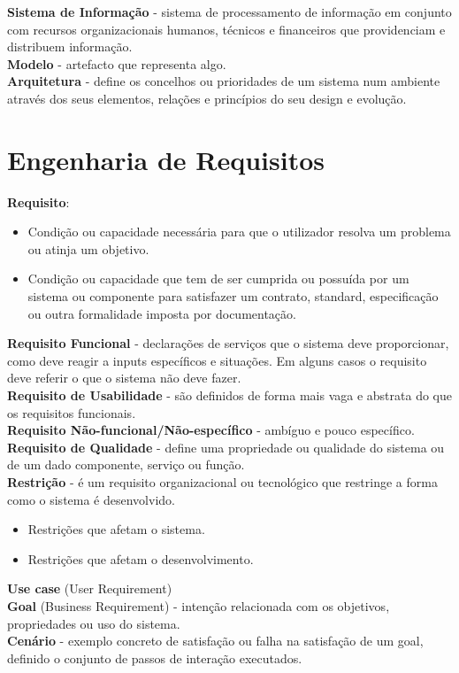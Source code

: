 \documentclass[12pt]{article}
\begin{document}
\vspace{6pt}
\textbf{Sistema de Informação} - sistema de processamento de informação em conjunto com recursos organizacionais humanos, técnicos e financeiros que providenciam e distribuem informação.
\\[6pt]
\textbf{Modelo} - artefacto que representa algo.
\\[6pt]
\textbf{Arquitetura} - define os concelhos ou prioridades de um sistema num ambiente através dos seus elementos, relações e princípios do seu design e evolução.

\newpage

\section{Engenharia de Requisitos}

\textbf{Requisito}:
\begin{itemize}[topsep=0pt, itemsep=0pt]
    \item Condição ou capacidade necessária para que o utilizador resolva um problema ou atinja um objetivo.
    \item Condição ou capacidade que tem de ser cumprida ou possuída por um sistema ou componente para satisfazer um contrato, standard, especificação ou outra formalidade imposta por documentação.
\end{itemize}
\vspace{6pt}
\textbf{Requisito Funcional} - declarações de serviços que o sistema deve proporcionar, como deve reagir a inputs específicos e situações. Em alguns casos o requisito deve referir o que o sistema não deve fazer.
\\[6pt]
\textbf{Requisito de Usabilidade} - são definidos de forma mais vaga e abstrata do que os requisitos funcionais.
\\[6pt]
\textbf{Requisito Não-funcional/Não-específico} - ambíguo e pouco específico.
\\[6pt]
\textbf{Requisito de Qualidade} - define uma propriedade ou qualidade do sistema ou de um dado componente, serviço ou função.
\\[6pt]
\textbf{Restrição} - é um requisito organizacional ou tecnológico que restringe a forma como o sistema é desenvolvido.
\begin{itemize}[topsep=0pt, itemsep=0pt]
    \item Restrições que afetam o sistema.
    \item Restrições que afetam o desenvolvimento.
\end{itemize}
\vspace{6pt}
\textbf{Use case} (User Requirement)
\\[6pt]
\textbf{Goal} (Business Requirement) - intenção relacionada com os objetivos, propriedades ou uso do sistema.
\\[6pt]
\textbf{Cenário} - exemplo concreto de satisfação ou falha na satisfação de um goal, definido o conjunto de passos de interação executados.
\end{document}
